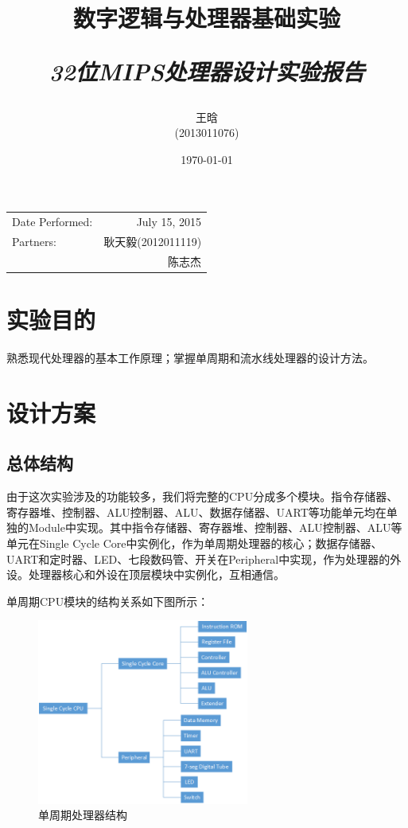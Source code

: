 \documentclass{article}
\title{\textbf{数字逻辑与处理器基础实验} \\ [2ex] \begin{large} \emph{32位MIPS处理器设计实验报告} \end{large} }
\author{王晗 \\ (2013011076)}
\date{\today}
\begin{document}
    \maketitle

    \begin{table}[htb]
        \centering
        \begin{tabular}{lr}
            Date Performed: & July 15, 2015 \\
            Partners:   & 耿天毅(2012011119) \\
                        & 陈志杰 \fbox{\begin{small}\emph{~~withdrawn~~}\end{small}} \\
        \end{tabular}
    \end{table}

    \section{实验目的}
        熟悉现代处理器的基本工作原理；掌握单周期和流水线处理器的设计方法。

    \section{设计方案}
        \subsection{总体结构}
            由于这次实验涉及的功能较多，我们将完整的CPU分成多个模块。指令存储器、寄存器堆、控制器、ALU控制器、ALU、数据存储器、UART等功能单元均在单独的Module中实现。其中指令存储器、寄存器堆、控制器、ALU控制器、ALU等单元在Single Cycle Core中实例化，作为单周期处理器的核心；数据存储器、UART和定时器、LED、七段数码管、开关在Peripheral中实现，作为处理器的外设。处理器核心和外设在顶层模块中实例化，互相通信。

            单周期CPU模块的结构关系如下图所示：
            \begin{figure}[H]
                    \centering
                    \includegraphics[width=0.62\textwidth]{images/singlecycle.png}
                    \caption{\label{fig:singlecycle}单周期处理器结构}
                \end{figure}
\end{document}
